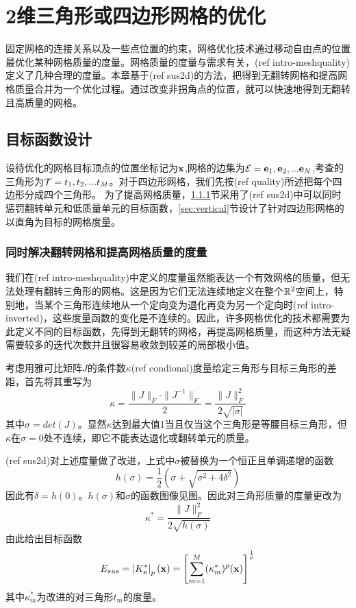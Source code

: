 \chapter{2维三角形或四边形网格的优化} \label{chap:sus2d}
固定网格的连接关系以及一些点位置的约束，网格优化技术通过移动自由点的位置最优化某种网格质量的度量。网格质量的度量与需求有关，(ref intro-meshquality)定义了几种合理的度量。本章基于(ref sus2d)的方法，把得到无翻转网格和提高网格质量合并为一个优化过程。通过改变非拐角点的位置，就可以快速地得到无翻转且高质量的网格。

\section{目标函数设计}\label{sec:objectives}
设待优化的网格目标顶点的位置坐标记为$\mathbf{x}$,网格的边集为$\mathcal{E}={\mathbf{e}_1,\mathbf{e}_2,...\mathbf{e}_N}$,考查的三角形为$\mathcal{T}={t_1,t_2,...t_M}$。对于四边形网格，我们先按(ref quality)所述把每个四边形分成四个三角形。
为了提高网格质量，\ref{sec:sus}节采用了(ref sus2d)中可以同时惩罚翻转单元和低质量单元的目标函数，\ref{sec:vertical}节设计了针对四边形网格的以直角为目标的网格度量。
\subsection{同时解决翻转网格和提高网格质量的度量}\label{sec:sus}
我们在(ref intro-meshquality)中定义的度量虽然能表达一个有效网格的质量，但无法处理有翻转三角形的网格。这是因为它们无法连续地定义在整个$\mathbb{R}^2$空间上，特别地，当某个三角形连续地从一个定向变为退化再变为另一个定向时(ref intro-inverted)，这些度量函数的变化是不连续的。因此，许多网格优化的技术都需要为此定义不同的目标函数，先得到无翻转的网格，再提高网格质量，而这种方法无疑需要较多的迭代次数并且很容易收敛到较差的局部极小值。

考虑用雅可比矩阵$J$的条件数$\kappa$(ref condional)度量给定三角形与目标三角形的差距，首先将其重写为
\begin{equation} \label{equ:kappa}
\kappa=\frac{\|J\|_F \cdot \|J^{-1}\|_F}{2}=\frac{\|J\|_F^2}{2\sqrt{|\sigma|}}
\end{equation}
其中$\sigma=det(J)$。显然$\kappa$达到最大值1当且仅当这个三角形是等腰目标三角形，但$\kappa$在$\sigma=0$处不连续，即它不能表达退化或翻转单元的质量。

(ref sus2d)对上述度量做了改进，上式中$\sigma$被替换为一个恒正且单调递增的函数
\begin{equation}\label{equ:h}
h(\sigma)=\frac{1}{2}(\sigma+\sqrt{\sigma^2+4\delta^2})
\end{equation}
因此有$\delta=h(0)$。$h(\sigma)$和$\sigma$的函数图像见图。因此对三角形质量的度量更改为
\begin{equation}\label{equ:kappa_star}
\kappa^*=\frac{\|J\|_F^2}{2\sqrt{h(\sigma)}}
\end{equation}
由此给出目标函数
\begin{equation} \label{equ:sus}
E_{sus}=\left|K_{\kappa}^*\right|_p(\mathbf{x})=\left[\sum_{m=1}^M(\kappa_m^*)^p(\mathbf{x})\right]^{\frac{1}{p}}
\end{equation}
其中$\kappa_m^*$为改进的对三角形$t_m$的度量。


